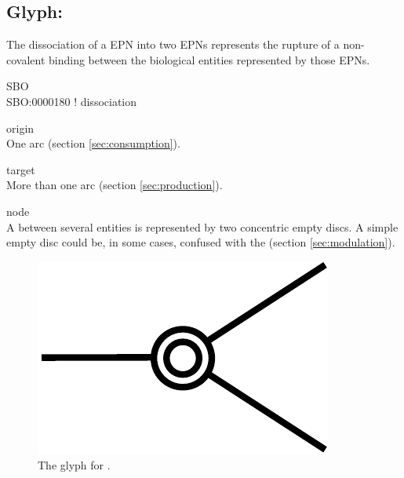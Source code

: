 \subsection{Glyph: }\label{sec:dissociation}

The dissociation of a EPN into two EPNs represents the rupture of a non-covalent binding between the biological entities represented by those EPNs.

\begin{glyphDescription}
 \item[SBO]\mbox{}\\ SBO:0000180 ! dissociation
 \item[origin]\mbox{}\\ One  arc (section \ref{sec:consumption}).
 \item[target]\mbox{}\\  More than one  arc (section \ref{sec:production}).
 \item[node]\mbox{}\\ A  between several entities is represented by two concentric empty discs. A simple empty disc could be, in some cases, confused with the  (section \ref{sec:modulation}).
 \end{glyphDescription}


\begin{figure}[H]
  \centering
  \includegraphics[scale = 0.5]{images/dissociation}
  \caption{The \PD glyph for .}
  \label{fig:dissociation}
\end{figure}
